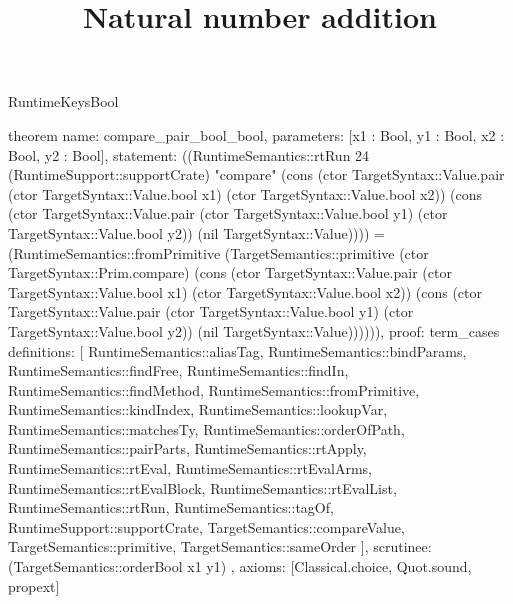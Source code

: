 \begin{lexlean}{RuntimeKeysBool}
\title{Natural number addition}
\begin{semanticmodule}
theorem{
  name: compare_pair_bool_bool,
  parameters: [x1 : Bool, y1 : Bool, x2 : Bool, y2 : Bool],
  statement: ((RuntimeSemantics::rtRun 24 (RuntimeSupport::supportCrate) "compare" (cons (ctor TargetSyntax::Value.pair (ctor TargetSyntax::Value.bool x1) (ctor TargetSyntax::Value.bool x2)) (cons (ctor TargetSyntax::Value.pair (ctor TargetSyntax::Value.bool y1) (ctor TargetSyntax::Value.bool y2)) (nil TargetSyntax::Value)))) = (RuntimeSemantics::fromPrimitive (TargetSemantics::primitive (ctor TargetSyntax::Prim.compare) (cons (ctor TargetSyntax::Value.pair (ctor TargetSyntax::Value.bool x1) (ctor TargetSyntax::Value.bool x2)) (cons (ctor TargetSyntax::Value.pair (ctor TargetSyntax::Value.bool y1) (ctor TargetSyntax::Value.bool y2)) (nil TargetSyntax::Value)))))),
  proof: term_cases{
    definitions: [
      RuntimeSemantics::aliasTag,
      RuntimeSemantics::bindParams,
      RuntimeSemantics::findFree,
      RuntimeSemantics::findIn,
      RuntimeSemantics::findMethod,
      RuntimeSemantics::fromPrimitive,
      RuntimeSemantics::kindIndex,
      RuntimeSemantics::lookupVar,
      RuntimeSemantics::matchesTy,
      RuntimeSemantics::orderOfPath,
      RuntimeSemantics::pairParts,
      RuntimeSemantics::rtApply,
      RuntimeSemantics::rtEval,
      RuntimeSemantics::rtEvalArms,
      RuntimeSemantics::rtEvalBlock,
      RuntimeSemantics::rtEvalList,
      RuntimeSemantics::rtRun,
      RuntimeSemantics::tagOf,
      RuntimeSupport::supportCrate,
      TargetSemantics::compareValue,
      TargetSemantics::primitive,
      TargetSemantics::sameOrder
    ],
    scrutinee: (TargetSemantics::orderBool x1 y1)
  },
  axioms: [Classical.choice, Quot.sound, propext]
}


\end{semanticmodule}
\end{lexlean}
